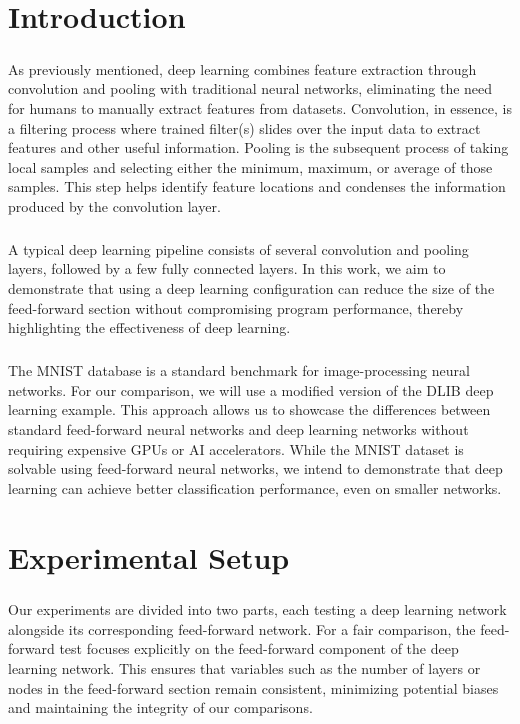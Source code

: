 \chapter{Introduction}
\paragraph{}As previously mentioned, deep learning combines feature extraction through convolution and pooling with traditional neural networks, eliminating the need for humans to manually extract features from datasets. Convolution, in essence, is a filtering process where trained filter(s) slides over the input data to extract features and other useful information. Pooling is the subsequent process of taking local samples and selecting either the minimum, maximum, or average of those samples. This step helps identify feature locations and condenses the information produced by the convolution layer.

\paragraph{}A typical deep learning pipeline consists of several convolution and pooling layers, followed by a few fully connected layers. In this work, we aim to demonstrate that using a deep learning configuration can reduce the size of the feed-forward section without compromising program performance, thereby highlighting the effectiveness of deep learning.

\paragraph{}The MNIST database is a standard benchmark for image-processing neural networks. For our comparison, we will use a modified version of the DLIB deep learning example. This approach allows us to showcase the differences between standard feed-forward neural networks and deep learning networks without requiring expensive GPUs or AI accelerators. While the MNIST dataset is solvable using feed-forward neural networks, we intend to demonstrate that deep learning can achieve better classification performance, even on smaller networks.

\chapter{Experimental Setup}
\paragraph{}
Our experiments are divided into two parts, each testing a deep learning network alongside its corresponding feed-forward network. For a fair comparison, the feed-forward test focuses explicitly on the feed-forward component of the deep learning network. This ensures that variables such as the number of layers or nodes in the feed-forward section remain consistent, minimizing potential biases and maintaining the integrity of our comparisons.

